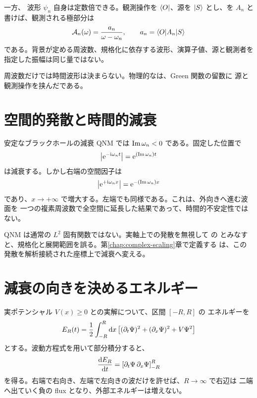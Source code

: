一方、 波形 $\psi_n$ 自身は定数倍できる。観測操作を $\langle O \rvert$、源を
$\lvert S \rangle$ とし、を $A_n$ と書けば、観測される極部分は
\begin{equation}
\mathcal{A}_n(\omega)
=
\frac{a_n}{\omega-\omega_n},
\qquad
a_n
=
\langle O \rvert A_n\lvert S \rangle
\label{eq:qnm-observable-residue}
\end{equation}
である。背景が定める周波数、規格化に依存する波形、演算子値、源と観測者を
指定した振幅は同じ量ではない\cite{Motohashi:2024fwt}。

\begin{principlebox}
周波数だけでは時間波形は決まらない。物理的なは、Green 関数の留数に
源と観測操作を挟んだである。
\end{principlebox}

\section{空間的発散と時間的減衰}

安定なブラックホールの減衰 QNM では $\operatorname{Im}\omega_n<0$ である。固定した位置で
\begin{equation}
\left|\mathrm{e}^{-\mathrm{i}\omega_n t}\right|
=
\mathrm{e}^{(\operatorname{Im}\omega_n)t}
\end{equation}
は減衰する。しかし右端の空間因子は
\begin{equation}
\left|\mathrm{e}^{+\mathrm{i}\omega_n x}\right|
=
\mathrm{e}^{-(\operatorname{Im}\omega_n)x}
\end{equation}
であり、$x\to+\infty$ で増大する。左端でも同様である。これは、外向きへ進む波面を
一つの複素周波数で全空間に延長した結果であって、時間的不安定性ではない。

\begin{warningbox}
QNM は通常の $L^2$ 固有関数ではない。実軸上での発散を無視して の
とみなすと、規格化と展開範囲を誤る。第\ref{chap:complex-scaling}章で定義する
は、この発散を解析接続された座標上で減衰へ変える。
\end{warningbox}

\section{減衰の向きを決めるエネルギー}

実ポテンシャル $V(x)\geq0$ との実解について、区間 $[-R,R]$ の
エネルギーを
\begin{equation}
E_R(t)
=
\frac{1}{2}
\int_{-R}^{R}\mathrm{d} x
\left[
(\partial_t\Psi)^2
+(\partial_x\Psi)^2
+V\Psi^2
\right]
\label{eq:qnm-energy-estimate}
\end{equation}
とする。波動方程式を用いて部分積分すると、
\begin{equation}
\frac{\mathrm{d} E_R}{\mathrm{d} t}
=
\left[\partial_t\Psi\,\partial_x\Psi\right]_{-R}^{R}
\label{eq:qnm-energy-flux-balance}
\end{equation}
を得る。右端で右向き、左端で左向きの波だけを許せば、$R\to\infty$ で右辺は
二端へ出ていく負の flux となり、外部エネルギーは増えない。

